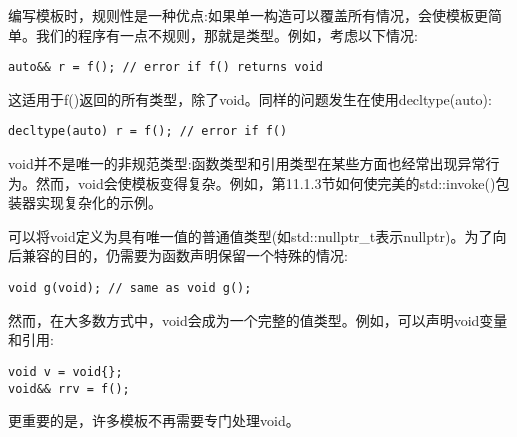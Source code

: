 编写模板时，规则性是一种优点:如果单一构造可以覆盖所有情况，会使模板更简单。我们的程序有一点不规则，那就是类型。例如，考虑以下情况:

\begin{lstlisting}[style=styleCXX]
auto&& r = f(); // error if f() returns void
\end{lstlisting}

这适用于f()返回的所有类型，除了void。同样的问题发生在使用decltype(auto):

\begin{lstlisting}[style=styleCXX]
decltype(auto) r = f(); // error if f()
\end{lstlisting}

void并不是唯一的非规范类型:函数类型和引用类型在某些方面也经常出现异常行为。然而，void会使模板变得复杂。例如，第11.1.3节如何使完美的std::invoke()包装器实现复杂化的示例。

可以将void定义为具有唯一值的普通值类型(如std::nullptr\_t表示nullptr)。为了向后兼容的目的，仍需要为函数声明保留一个特殊的情况:

\begin{lstlisting}[style=styleCXX]
void g(void); // same as void g();
\end{lstlisting}

然而，在大多数方式中，void会成为一个完整的值类型。例如，可以声明void变量和引用:

\begin{lstlisting}[style=styleCXX]
void v = void{};
void&& rrv = f();
\end{lstlisting}

更重要的是，许多模板不再需要专门处理void。













































